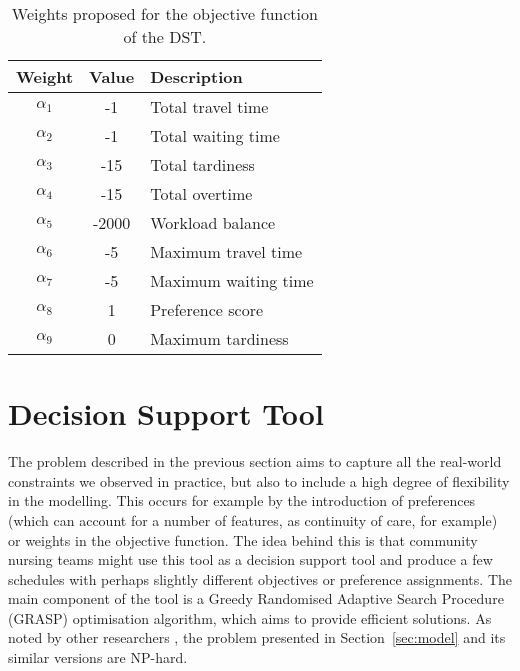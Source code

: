 \documentclass[a4paper,11pt,authoryear]{elsarticle}
\begin{document}
\begin{table}[htbp!]
    \centering
    \caption{Weights proposed for the objective function of the DST.}
    \begin{tabular}{ccl}
    \toprule
    \textbf{Weight}  & \textbf{Value} & \textbf{Description} \\
    \midrule
    $\alpha_1$      &   -1   &   Total travel time \\
    $\alpha_2$      &   -1   &   Total waiting time \\
    $\alpha_3$      &   -15   &   Total tardiness \\
    $\alpha_4$      &   -15   &   Total overtime \\   
    $\alpha_5$      &   -2000   &   Workload balance\\       
    $\alpha_6$      &   -5   &   Maximum travel time\\       
    $\alpha_7$      &   -5   &   Maximum waiting time\\       
    $\alpha_8$      &   1   &   Preference score \\    
    $\alpha_9$      &   0   &   Maximum tardiness\\    
    \bottomrule
    \end{tabular}
    \label{table:adequateweights}
\end{table}


\section{Decision Support Tool}
\label{sec:dst}
\noindent The problem described in the previous section aims to capture all the real-world constraints we observed in practice, but also to include a high degree of flexibility in the modelling. This occurs for example by the introduction of preferences (which can account for a number of features, as continuity of care, for example) or weights in the objective function. The idea behind this is that community nursing teams might use this tool as a decision support tool and produce a few schedules with perhaps slightly different objectives or preference assignments. The main component of the tool is a Greedy Randomised Adaptive Search Procedure (GRASP) optimisation algorithm, which aims to provide efficient solutions. As noted by other researchers \cite[e.g.][]{bertels2006, rasmussen2012, mankowska2014}, the problem presented in Section~\ref{sec:model} and its similar versions are NP-hard.
\end{document}

